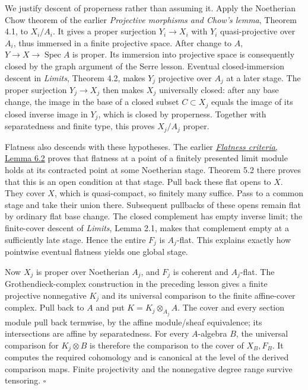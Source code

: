 \documentclass[11pt]{article}
\begin{document}
We justify descent of properness rather than assuming it. Apply the
Noetherian Chow theorem of the earlier \emph{Projective morphisms and
Chow's lemma}, Theorem 4.1, to \(X_i/A_i\). It gives a proper surjection
\(Y_i\to X_i\) with \(Y_i\) quasi-projective over \(A_i\), thus immersed
in a finite projective space. After change to \(A\),
\(Y\to X\to\operatorname{Spec}A\) is proper. Its immersion into
projective space is consequently closed by the graph argument of the
Serre lesson. Eventual closed-immersion descent in \emph{Limits},
Theorem 4.2, makes \(Y_j\) projective over \(A_j\) at a later stage. The
proper surjection \(Y_j\to X_j\) then makes \(X_j\) universally closed:
after any base change, the image in the base of a closed subset
\(C\subset X_j\) equals the image of its closed inverse image in
\(Y_j\), which is closed by properness. Together with separatedness and
finite type, this proves \(X_j/A_j\) proper.

Flatness also descends with these hypotheses. The earlier
\href{../AG-FSE/AG-FSE-02.html\#6-finite-presentations-over-an-arbitrary-base}{\emph{Flatness
criteria}, Lemma 6.2} proves that flatness at a point of a finitely
presented limit module holds at its contracted point at some Noetherian
stage. Theorem 5.2 there proves that this is an open condition at that
stage. Pull back these flat opens to \(X\). They cover \(X\), which is
quasi-compact, so finitely many suffice. Pass to a common stage and take
their union there. Subsequent pullbacks of these opens remain flat by
ordinary flat base change. The closed complement has empty inverse
limit; the finite-cover descent of \emph{Limits}, Lemma 2.1, makes that
complement empty at a sufficiently late stage. Hence the entire \(F_j\)
is \(A_j\)-flat. This explains exactly how pointwise eventual flatness
yields one global stage.

Now \(X_j\) is proper over Noetherian \(A_j\), and \(F_j\) is coherent
and \(A_j\)-flat. The Grothendieck-complex construction in the preceding
lesson gives a finite projective nonnegative \(K_j\) and its universal
comparison to the finite affine-cover complex. Pull back to \(A\) and
put \(K=K_j\otimes_{A_j}A\). The cover and every section module pull
back termwise, by the affine module/sheaf equivalence; its intersections
are affine by separatedness. For every \(A\)-algebra \(B\), the
universal comparison for \(K_j\otimes B\) is therefore the comparison to
the cover of \(X_B,F_B\). It computes the required cohomology and is
canonical at the level of the derived comparison maps. Finite
projectivity and the nonnegative degree range survive tensoring.
\(\square\)
\end{document}
